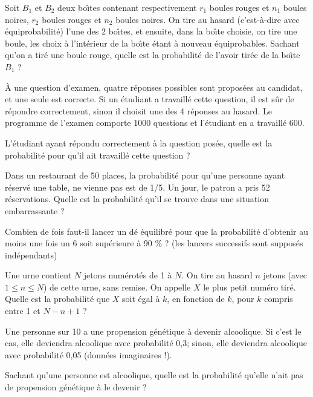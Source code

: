 \begin{exo}Soit $B_{1}$ et $B_{2}$ deux bo\^\i tes contenant respectivement $r_{1}$ boules rouges et $n_{1}$ boules noires, $r_{2}$ boules rouges et $n_{2}$ boules noires. On tire au hasard (c'est-\`a-dire avec  \'equiprobabilit\'e) l'une des 2 bo\^\i tes, et ensuite, dans la bo\^\i te choisie, on tire une boule, les choix  \`a  l'int\'erieur de la bo\^\i te  \'etant  \`a  nouveau  \'equiprobables. Sachant qu'on a tir\'e une boule rouge, quelle est la probabilit\'e de l'avoir tir\'ee de la bo\^\i te $B_{1}$ ?
\end{exo}


\begin{exo} \`A une question d'examen, quatre r\'eponses possibles sont propos\'ees au
candidat, et une seule est correcte. Si un \'etudiant a travaill\'e cette question, il est
s\^ur de r\'epondre correctement, sinon il choisit une des 4 r\'eponses au hasard. Le
programme de l'examen comporte 1000 questions et l'\'etudiant en a travaill\'e 600.

L'\'etudiant ayant r\'epondu correctement \`a la question pos\'ee, quelle est la probabilit\'e
pour qu'il ait travaillé cette question ?
\end{exo}


\begin{exo}
Dans un restaurant de 50 places, la probabilit\'e pour qu'une
personne ayant r\'eserv\'e une table, ne vienne pas est de 1/5. Un
jour, le patron a pris 52 r\'eservations. Quelle est la probabilit\'e
qu'il se trouve dans une situation embarrassante ?
\end{exo}

\begin{exo} Combien de fois faut-il lancer un d\'e \'equilibr\'e pour que la probabilit\'e d'obtenir au moins une fois un 6 soit sup\'erieure \`a 90 \% ? (les lancers successifs
sont suppos\'es ind\'ependants)
\end{exo}


\begin{exo} Une urne contient $N$ jetons num\'erot\'es de 1  \`a $N$. On tire au hasard $n$ jetons (avec $1\leq n\leq N$) de cette urne, sans remise. On appelle $X$ le plus petit num\'ero tir\'e. Quelle est la probabilit\'e que $X$ soit  \'egal  \`a $k$, en fonction de $k$, pour $k$ compris entre 1 et $N-n+1$ ?
\end{exo}

\begin{exo} Une personne sur 10 a une propension g\'en\'etique
\`a devenir alcoolique. Si c'est le cas, elle deviendra alcoolique avec probabilité 0,3; sinon,
elle deviendra alcoolique avec probabilité 0,05 (donn\'ees imaginaires !).

Sachant qu'une personne est alcoolique, quelle est la probabilité qu'elle n'ait pas de propension
g\'en\'etique \`a le devenir ?
\end{exo}

